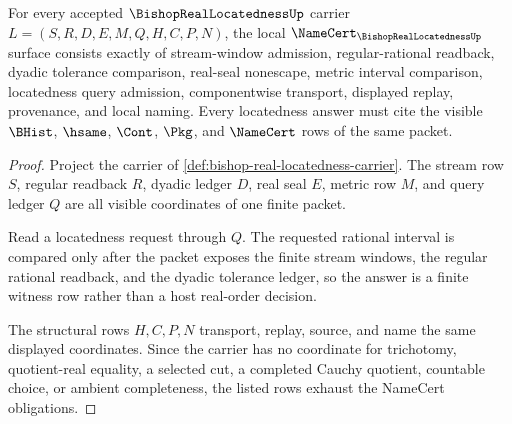 \begin{theorem}
\label{thm:bishop-real-locatedness-namecert-obligations}
For every accepted $\BishopRealLocatednessUp$ carrier $L=(S,R,D,E,M,Q,H,C,P,N)$, the local $\NameCert_{\BishopRealLocatednessUp}$ surface consists exactly of stream-window admission, regular-rational readback, dyadic tolerance comparison, real-seal nonescape, metric interval comparison, locatedness query admission, componentwise transport, displayed replay, provenance, and local naming. Every locatedness answer must cite the visible $\BHist$, $\hsame$, $\Cont$, $\Pkg$, and $\NameCert$ rows of the same packet.
\end{theorem}
\begin{proof}
Project the carrier of \autoref{def:bishop-real-locatedness-carrier}. The stream row $S$, regular readback $R$, dyadic ledger $D$, real seal $E$, metric row $M$, and query ledger $Q$ are all visible coordinates of one finite packet.

Read a locatedness request through $Q$. The requested rational interval is compared only after the packet exposes the finite stream windows, the regular rational readback, and the dyadic tolerance ledger, so the answer is a finite witness row rather than a host real-order decision.

The structural rows $H,C,P,N$ transport, replay, source, and name the same displayed coordinates. Since the carrier has no coordinate for trichotomy, quotient-real equality, a selected cut, a completed Cauchy quotient, countable choice, or ambient completeness, the listed rows exhaust the NameCert obligations.
\end{proof}

